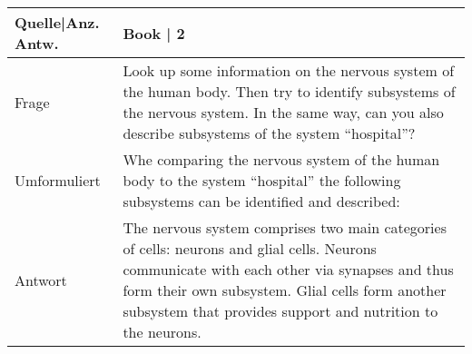 {\begin{landscape}
\begin{longtable}{p{3cm}p{}}
    Quelle|Anz. Antw. &  Book  | 2 \\
    \midrule
    Frage & Look up some information on the nervous system of the human body.
    Then try to identify subsystems of the nervous system.
    In the same way, can you also describe subsystems of the system ``hospital''? \\
    Umformuliert & Whe comparing the nervous system of the human body to the system ``hospital'' the following subsystems can be identified and described: \\
    Antwort & The nervous system comprises two main categories of cells: neurons and glial cells.
    Neurons communicate with each other via synapses and thus form their own subsystem.
    Glial cells form another subsystem that provides support and nutrition to the neurons.


\end{longtable}
\end{landscape}}
